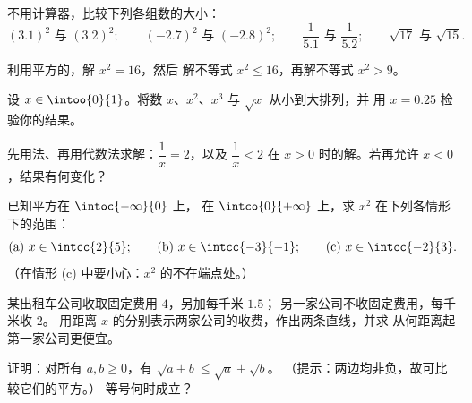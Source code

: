 \begin{exercise}[$\star$]\label{exo:g10:reffunc:3}
不用计算器，比较下列各组数的大小：
\[
(3.1)^2 \text{ 与 } (3.2)^2; \qquad
(-2.7)^2 \text{ 与 } (-2.8)^2; \qquad
\frac{1}{5.1} \text{ 与 } \frac{1}{5.2}; \qquad
\sqrt{17} \text{ 与 } \sqrt{15}.
\]
\end{exercise}

\begin{exercise}[$\star$]\label{exo:g10:reffunc:4}
利用平方的，解 $x^2 = 16$，然后
解不等式 $x^2 \leq 16$，再解不等式 $x^2 > 9$。
\end{exercise}

\begin{exercise}[$\star$]\label{exo:g10:reffunc:5}
设 $x \in \intoo{0}{1}$。将数 $x$、$x^2$、$x^3$ 与
$\sqrt x$ 从小到大排列，并
用 $x = 0.25$ 检验你的结果。
\end{exercise}

\begin{exercise}[$\star\star$]\label{exo:g10:reffunc:6}
先用法、再用代数法求解：$\dfrac1x = 2$，以及
$\dfrac1x < 2$ 在 $x > 0$ 时的解。若再允许 $x < 0$，结果有何变化？
\end{exercise}

\begin{exercise}[$\star\star$]\label{exo:g10:reffunc:7}
已知平方在 $\intoc{-\infty}{0}$ 上，
在 $\intco{0}{+\infty}$ 上，求 $x^2$ 在下列各情形下的范围：
\[
\text{(a) } x \in \intcc{2}{5};
\qquad
\text{(b) } x \in \intcc{-3}{-1};
\qquad
\text{(c) } x \in \intcc{-2}{3}.
\]
（在情形 (c) 中要小心：$x^2$ 的不在端点处。）
\end{exercise}

\begin{exercise}[$\star\star$]\label{exo:g10:reffunc:8}
某出租车公司收取固定费用 $4$，另加每千米 $1.5$；
另一家公司不收固定费用，每千米收 $2$。
用距离 $x$ 的分别表示两家公司的收费，作出两条直线，并求
从何距离起第一家公司更便宜。
\end{exercise}

\begin{exercise}[$\star\star$]\label{exo:g10:reffunc:9}
证明：对所有 $a, b \geq 0$，有 $\sqrt{a + b} \leq \sqrt a + \sqrt b$。
（提示：两边均非负，故可比较它们的平方。）
等号何时成立？
\end{exercise}

